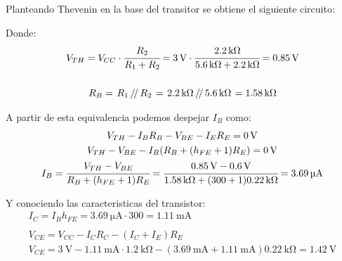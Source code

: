 \documentclass[a4paper,12pt]{article}
\newcommand{\parallelTwo}[2]{\left.#1\,\middle/\!\middle/\,#2\right.}
\newcommand{\mR}[1]{\SI{#1}{\kilo\ohm}}
\newcommand{\mI}[1]{\SI{#1}{\milli\ampere}}
\newcommand{\mIu}[1]{\SI{#1}{\micro\ampere}}
\newcommand{\mV}[1]{\SI{#1}{\volt}}
\begin{document}
    Planteando Thevenin en la base del transitor se obtiene el siguiente circuito:
    \begin{figure}[H]
        \setlength{\abovecaptionskip}{0pt}
		\centering
		\captionsetup{labelformat=empty}
    \end{figure}
    Donde:
    \begin{gather*}
        V_{TH} = V_{CC} \cdot \cfrac{R_2}{R_1 + R_2} 
            = \mV{3} \cdot \cfrac{\mR{2.2}}{\mR{5.6} + \mR{2.2}} = \mV{0.85}
        \\ \\
        R_B = \parallelTwo{R_1}{R_2} = \parallelTwo{\mR{2.2}}{\mR{5.6}} = \mR{1.58}
    \end{gather*}

    A partir de esta equivalencia podemos despejar $I_B$ como:
    \begin{gather*}
        V_{TH} - I_B R_B - V_{BE} - I_E R_E = \mV{0} \\
        V_{TH} - V_{BE} - I_B ( R_B + (h_{FE}+1) R_E ) = \mV{0} \\
        I_B = \cfrac{V_{TH} - V_{BE}}{R_B + ( h_{FE}+1 ) R_E} 
            = \cfrac{ \mV{0.85} - \mV{0.6} } { \mR{1.58} + (300+1) \mR{0.22} } = \mIu{3.69} 
    \end{gather*}

    Y conociendo las caracteristicas del transistor:
    \begin{gather*}
        I_C = I_B h_{FE} = \mIu{3.69} \cdot 300 = \mI{1.11}
        \\ \\
        V_{CE} = V_{CC} - I_C R_C - (I_C + I_E) R_E \\
        V_{CE} = \mV{3} - \mI{1.11} \cdot \mR{1.2} - ( \mI{3.69} + \mI{1.11} ) \mR{0.22} = \mV{1.42}
    \end{gather*}
\end{document}
